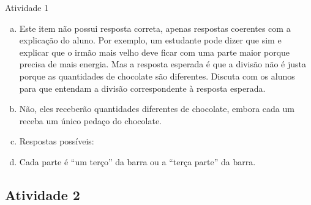 \begin{multicols}{2}

\begin{resposta*}{Atividade 1}
  \begin{enumerate}[a),wide,labelindent=0pt] %
    \item       Este item não possui resposta correta, apenas respostas coerentes com a explicação do aluno. Por exemplo, um estudante pode dizer que sim e explicar que o irmão mais velho deve ficar com uma parte maior porque precisa de mais energia. Mas a resposta esperada é que a divisão não é justa porque as quantidades de chocolate são diferentes. Discuta com os alunos para que entendam a divisão correspondente à resposta esperada.
    \item       Não, eles receberão quantidades diferentes de chocolate, embora cada um receba um único pedaço do chocolate.
    \item       Respostas possíveis:
  

    \item       Cada parte é ``um terço'' da barra ou a ``terça parte'' da barra.
\end{enumerate} %
\end{resposta*}

\subsection{Atividade 2}

   \vspace{.1cm}


\end{multicols}
